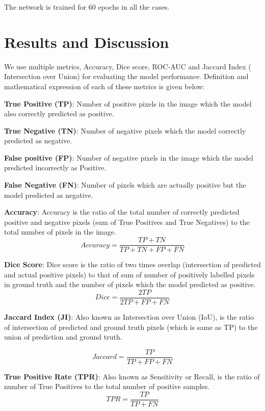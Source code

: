 \documentclass[utf8]{FrontiersinHarvard} %
\begin{document}
The network is trained for 60 epochs in all the cases.

\section{Results and Discussion}\label{sec:results}
We use multiple metrics, Accuracy, Dice score, ROC-AUC and Jaccard Index ( Intersection over Union) for evaluating the model performance. Definition and mathematical expression of each of these metrics is given below:

\textbf{True Positive (TP)}: Number of positive pixels in the image which the model also correctly predicted as positive.

\textbf{True Negative (TN)}: Number of negative pixels which the model correctly predicted as negative.

\textbf{False positive (FP)}: Number of negative pixels in the image which the model predicted incorrectly as Positive.

\textbf{False Negative (FN)}: Number of pixels which are actually positive but the model predicted as negative.

\textbf{Accuracy}: Accuracy is the ratio of the total number of correctly predicted positive and negative pixels (sum of True Positives and True Negatives) to the total number of pixels in the image.
\begin{equation}
Accuracy = \frac{TP+TN}{TP+TN+FP+FN}
\end{equation}

\textbf{Dice Score}: Dice score is the ratio of two times overlap (intersection of predicted and actual positive pixels) to that of sum of number of positively labelled pixels in ground truth and the number of pixels which the model predicted as positive.
\begin{equation}
Dice = \frac{2TP}{2TP + FP + FN}
\end{equation}

\textbf{Jaccard Index (JI)}: Also known as Intersection over Union (IoU), is the ratio of intersection of predicted and ground truth pixels (which is same as TP) to the union of prediction and ground truth.

\begin{equation}
Jaccard = \frac{TP}{TP + FP + FN}
\end{equation}

\textbf{True Positive Rate (TPR)}: Also known as Sensitivity or Recall, is the ratio of number of True Positives to the total number of positive samples.
\begin{equation}
TPR = \frac{TP}{TP + FN}
\end{equation}
\end{document}

